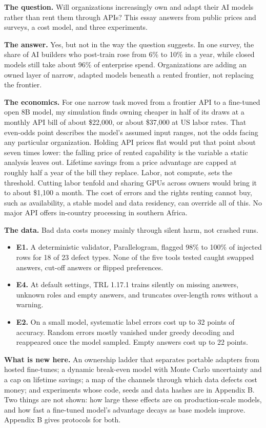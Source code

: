 \textbf{The question.} Will organizations increasingly own and adapt their AI models rather than rent them through APIs? This essay answers from public prices and surveys, a cost model, and three experiments.

\textbf{The answer.} Yes, but not in the way the question suggests.  In one survey, the share of AI builders who post-train rose from 6\% to 10\% in a year, while closed models still take about 96\% of enterprise spend. Organizations are adding an owned layer of narrow, adapted models beneath a rented frontier, not replacing the frontier.

\textbf{The economics.}  For one narrow task moved from a frontier API to a fine-tuned open 8B model, my simulation finds owning cheaper in half of its draws at a monthly API bill of about \$22,000, or about \$37,000 at US labor rates. That even-odds point describes the model's assumed input ranges, not the odds facing any particular organization. Holding API prices flat would put that point about seven times lower: the falling price of rented capability is the variable a static analysis leaves out. Lifetime savings from a price advantage are capped at roughly half a year of the bill they replace. Labor, not compute, sets the threshold. Cutting labor tenfold and sharing GPUs across owners would bring it to about \$1,100 a month. The cost of errors and the rights renting cannot buy, such as availability, a stable model and data residency, can override all of this. No major API offers in-country processing in southern Africa.

\textbf{The data.}  Bad data costs money mainly through silent harm, not crashed runs.

\begin{itemize}
\tightlist
\item
  \textbf{E1.} A deterministic validator, Parallelogram, flagged 98\% to 100\% of injected rows for 18 of 23 defect types. None of the five tools tested caught swapped answers, cut-off answers or flipped preferences.
\item
  \textbf{E4.} At default settings, TRL 1.17.1 trains silently on missing answers, unknown roles and empty answers, and truncates over-length rows without a warning.
\item
  \textbf{E2.} On a small model, systematic label errors cost up to 32 points of accuracy. Random errors mostly vanished under greedy decoding and reappeared once the model sampled. Empty answers cost up to 22 points.
\end{itemize}

\textbf{What is new here.} An ownership ladder that separates portable adapters from hosted fine-tunes; a dynamic break-even model with Monte Carlo uncertainty and a cap on lifetime savings; a map of the channels through which data defects cost money; and experiments whose code, seeds and data hashes are in Appendix B. Two things are not shown: how large these effects are on production-scale models, and how fast a fine-tuned model's advantage decays as base models improve. Appendix B gives protocols for both.
